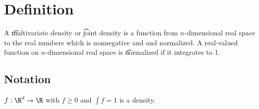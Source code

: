 
\section*{Definition}

A \t{multivariate density} or \t{joint density} is a function from $n$-dimensional real space to the real numbers which is nonnegative and and normalized.
A real-valued function on $n$-dimensional real space is \t{normalized} if it integrates to 1.

\subsection*{Notation}

$f: \R ^d \to \R $ with $f \geq 0$ and $\int f = 1$ is a density.

\blankpage